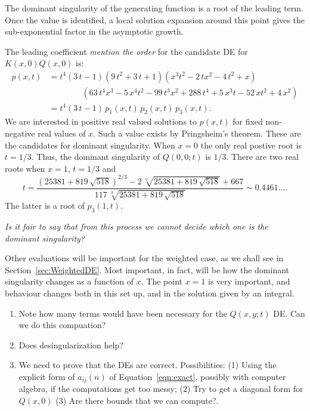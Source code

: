 \documentclass[11pt]{article}
\newcommand\mjm[1]{\mbox{}
{\marginpar{\color{red!50}$\EuScript{M}$}}
{\it\noindent\color{red!50}#1}}%
\begin{document}
The dominant singularity of the generating function is a root of the
leading term. Once the value is identified, a local solution expansion
around this point gives the sub-exponential factor in the asymptotic
growth.

The leading coefficient \mjm{mention the order} for the candidate DE for $K(x,0)Q(x,0)$ is:
\begin{align*}
p(x,t)&={t}^{4} \left( 3\,t-1 \right)  \left( 9\,{t}^{2}+3\,t+1 \right) 
 \left( {x}^{3}{t}^{2}-2\,t{x}^{2}-4\,{t}^{2}+x \right) \\& \qquad \qquad \left( 63\,{t
}^{4}{x}^{3}-5\,{x}^{4}{t}^{2}-99\,{t}^{3}{x}^{2}+288\,{t}^{4}+5\,{x}^
{3}t-52\,x{t}^{2}+4\,{x}^{2} \right)
\\&= {t}^{4} \left( 3\,t-1 \right) \, p_1(x,t)\,  p_2(x,t)\,  p_3(x,t).
\end{align*}
We are interested in positive real valued solutions to $p(x,t)$ for fixed
non-negative real values of $x$. Such a value exists by Pringsheim's
theorem. These are the candidates for dominant singularity. 
When $x=0$ the only real postive root is $t=1/3$. Thus, the dominant
singularity of $Q(0,0;t)$ is $1/3$. There are two real roots when
$x=1$, $t=1/3$ and 
\[t={\frac { \left( 25381+819\,\sqrt {518} \right) ^{2/3}-2\,\sqrt [3]{
25381+819\,\sqrt {518}}+667}{117\,\sqrt [3]{25381+819\,\sqrt {518}}}}
\sim 0.4461\dots.\] The latter is a root of $p_3(1,t)$. 

\mjm{Is it fair to say that from this process we cannot decide which
  one is the dominant singularity?}

Other evaluations will be important for the weighted case, as we shall
see in Section~\ref{sec:WeightedDE}. Most important, in fact, will be
how the dominant singularity changes as a function of $x$. The point
$x=1$ is very important, and behaviour changes both in this set up,
and in the solution given by an integral.

\mjm{
\begin{enumerate}
\item Note how many terms would have been necessary for the $Q(x,y;t)$
  DE. Can we do this compuation?
\item Does desingularization help?
\item We need to prove that the DEs are correct. Possibilities: (1)
  Using the explicit form of $a_{ij}(n)$ of Equation~\ref{eqn:exact},
  possibly with computer algebra, if the computations get too messy;
  (2) Try to get a diagonal form for $Q(x,0)$ (3) Are there bounds
  that we can compute?.
\end{enumerate}

}
\end{document}
